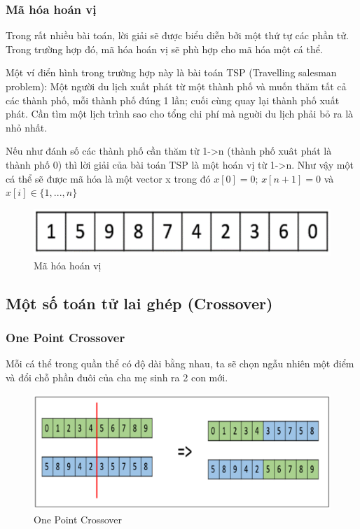\documentclass[a4paper,12pt]{report}
\begin{document}
\subsubsection{Mã hóa hoán vị}
Trong rất nhiều bài toán, lời giải sẽ được biểu diễn bởi một thứ tự các phần tử. Trong trường hợp đó, mã hóa hoán vị sẽ phù hợp cho mã hóa một cá thể.
\par Một ví điển hình trong trường hợp này là bài toán TSP (Travelling salesman problem): Một người du lịch xuất phát từ một thành phố và muốn thăm tất cả các thành phố, mỗi thành phố đúng 1 lần; cuối cùng quay lại thành phố xuất phát. Cần tìm một lịch trình sao cho tổng chi phí mà nguời du lịch phải bỏ ra là nhỏ nhất.
\par Nếu như đánh số các thành phố cần thăm từ 1->n (thành phố xuât phát là thành phố 0) thì lời giải của bài toán TSP là một hoán vị từ 1->n. Như vậy một cá thể sẽ được mã hóa là một vector x trong đó $x[0] = 0$; $x[n+1] = 0$ và $x[i] \in \{1,...,n\}$ 
\begin{figure}[H]
\centering
\includegraphics[scale=0.6]{permutation_representation.PNG}
\caption{Mã hóa hoán vị}
\end{figure}

\subsection{Một số toán tử lai ghép (Crossover)}
\subsubsection{One Point Crossover}
Mỗi cá thể trong quần thể có độ dài bằng nhau, ta sẽ chọn ngẫu nhiên một điểm và đổi chỗ phần đuôi của cha mẹ sinh ra 2 con mới. 
\begin{figure}[H]
\centering
\includegraphics[scale=0.4]{one_point_crossover.png}
\caption{One Point Crossover}
\end{figure}
\end{document}
